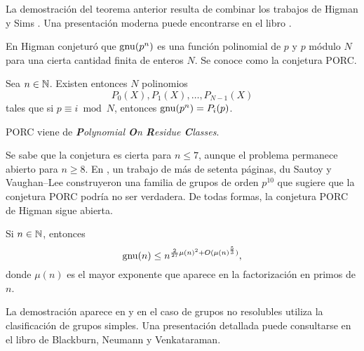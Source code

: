 La demostración del teorema anterior resulta de combinar los trabajos de Higman \cite{MR113948} 
y Sims \cite{MR169921}. Una presentación moderna puede encontrarse en el libro
\cite{MR2382539}. 

En \cite{MR123605} Higman conjeturó 
que $\operatorname{gnu}(p^n)$ es una función polinomial de $p$ y $p$ módulo $N$ para una cierta
cantidad finita de enteros $N$. Se conoce como la conjetura PORC.

\begin{conjecture}[Higman]
Sea $n\in\mathbb{N}$. Existen entonces $N$ polinomios 
\[
P_{0}(X),P_{1}(X),\dots,P_{N-1}(X)
\]
tales que
si $p\equiv i\bmod N$, entonces $\operatorname{gnu}(p^n)=P_{i}(p)$. 
\end{conjecture}

PORC viene de \emph{\textbf{P}olynomial \textbf{O}n \textbf{R}esidue \textbf{C}lasses}. 

Se sabe que la conjetura es cierta para $n\leq7$, aunque el problema permanece abierto para $n\geq8$. 
En \cite{MR2921623}, un trabajo de más de setenta páginas, 
du Sautoy y Vaughan--Lee construyeron una familia de grupos
de orden $p^{10}$ que sugiere que la conjetura PORC podría no ser verdadera. De todas formas, la conjetura
PORC de Higman sigue abierta. 

\begin{theorem}[Pyber]
Si $n\in\mathbb{N}$, entonces 
\[
\operatorname{gnu}(n)\leq n^{\frac{2}{27}\mu(n)^2+O(\mu(n)^{\frac{5}{3}})},
\]
donde $\mu(n)$ es el mayor exponente
que aparece en la factorización en primos de $n$. 
\end{theorem}

La demostración aparece en \cite{MR1200081} y en el caso de grupos no resolubles utiliza la clasificación de grupos simples. Una presentación detallada puede consultarse en el libro 
\cite{MR2382539} de Blackburn, Neumann y Venkataraman.

